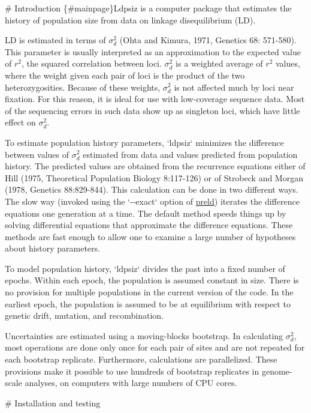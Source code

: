 \# \-Introduction \{\#mainpage\}\-Ldpsiz is a computer package that estimates the history of population size from data on linkage disequilibrium (\-L\-D).

\-L\-D is estimated in terms of $\sigma_d^2$ (\-Ohta and \-Kimura, 1971, \-Genetics 68\-: 571-\/580). \-This parameter is usually interpreted as an approximation to the expected value of $r^2$, the squared correlation between loci. $\sigma_d^2$ is a weighted average of $r^2$ values, where the weight given each pair of loci is the product of the two heterozygosities. \-Because of these weights, $\sigma_d^2$ is not affected much by loci near fixation. \-For this reason, it is ideal for use with low-\/coverage sequence data. \-Most of the sequencing errors in such data show up as singleton loci, which have little effect on $\sigma_d^2$.

\-To estimate population history parameters, `ldpsiz` minimizes the difference between values of $\sigma_d^2$ estimated from data and values predicted from population history. \-The predicted values are obtained from the recurrence equations either of \-Hill (1975, \-Theoretical \-Population \-Biology 8\-:117-\/126) or of \-Strobeck and \-Morgan (1978, \-Genetics 88\-:829-\/844). \-This calculation can be done in two different ways. \-The slow way (invoked using the `-\/-\/exact` option of \hyperlink{preld_8c_preld}{preld}) iterates the difference equations one generation at a time. \-The default method speeds things up by solving differential equations that approximate the difference equations. \-These methods are fast enough to allow one to examine a large number of hypotheses about history parameters.

\-To model population history, `ldpsiz` divides the past into a fixed number of epochs. \-Within each epoch, the population is assumed constant in size. \-There is no provision for multiple populations in the current version of the code. \-In the earliest epoch, the population is assumed to be at equilibrium with respect to genetic drift, mutation, and recombination.

\-Uncertainties are estimated using a moving-\/blocks bootstrap. \-In calculating $\sigma_d^2$, most operations are done only once for each pair of sites and are not repeated for each bootstrap replicate. \-Furthermore, calculations are parallelized. \-These provisions make it possible to use hundreds of bootstrap replicates in genome-\/scale analyses, on computers with large numbers of \-C\-P\-U cores.

\# \-Installation and testing

